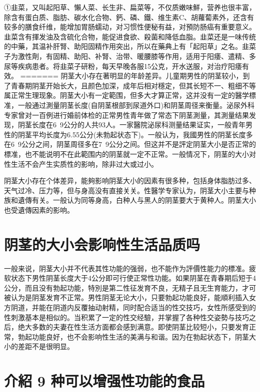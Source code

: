 \documentclass[12pt,UTF8]{ctexbook}
\begin{document}
①韭菜，又叫起阳草、懶人菜、长生非、扁菜等，不仅质嫩味鮮，营养也很丰富，除含有蛋白质、脂肪、碳水化合物、鈣、磷、鐵、维生素C、胡蘿蔔素外，还含有较多的膳食纤维，能增加胃肠蠕动，对习惯性便秘有益，对預防肠癌有重要意义。韭菜含有揮发油及含硫化合物，能促进食欲、殺菌和降低血脂。韭菜还是一味传统的中藥，其温补肝腎、助阳固精作用突出，所以在藥典上有「起阳草」之名。韭菜子为激性劑，有固精、助阳、补腎、治带、暖腰膝等作用，适用于阳痿、遣精、多尿等疾病患者。将韭菜子研粉，每天早晚各服15公克，开水送服，对治疗阳痿有效。
=======
阴茎大小存在著明显的年龄差异。儿童期男性的阴茎较小，到了青春期阴茎开始长大，且颜色加深，成年后相对穩定，但其长短不一、粗细不等属正常生理现象。阴茎大小有一定範围，但多大才算正常，这并没有一定的醫学標准，一般通过測量阴茎长度(自阴茎根部到尿道外口)和阴茎周径来衡量。泌尿外科专家曾对一百例进行婚前体检的正常男性青年做了常态下阴茎測量，其測量结果发现，阴茎长度在6~9公分的人共93人。一家醫院泌尿科测量结果证实，一般青年男性的阴茎平均长度为6.55公分(未勃起状态下)。一般认为，我國男性的阴茎长度多在6~9公分之间，阴茎周径多在7~9公分之间。但这并不是評定阴茎大小是否正常的標准，也不能说明不在此範围内的阴茎就一定不正常。一般情况下，阴茎的大小对性生活不会产生实质性的影响，除非过大或过小。

阴茎大小存在个体差异，能夠影响阴茎大小的因素有很多种，包括身体脂肪过多、天气过冷、压力等，但与身高没有直接关关。性醫学专家认为，阴茎大小主要与种族和遺傳有关。一般认为同等身高，白种人与黑人的阴茎要大于黄种人。阴茎大小也受遺傳因素的影响。

\section{阴茎的大小会影响性生活品质吗}

一般来说，阴茎大小并不代表其性功能的强弱，也不能作为評價性能力的標准。疲软状态下男性阴茎长度大于4公分即可行使正常性功能。如果阴茎在青春期后短于4公分，而且没有勃起功能，特別是第二性征发育不良，无精子且无生育能力，才可被认为是阴茎发育不正常。男性阴茎无论大小，只要勃起功能良好，能順利插入女方阴道，并能在阴道内反覆抽动射精，同时配合适当的性交技巧，女性所感受到的性刺激基本是相似的。当积累了一定的性交经驗，并掌握了各种性交姿勢与技巧之后，绝大多数的夫妻在性生活方面都会感到满意。即使阴茎比较短小，只要发育正常，勃起功能良好，也不会影响性生活的美满与和谐。因为在勃起状态下，阴茎大小的差距不是很明显。

\section{介紹 9 种可以增强性功能的食品}
\end{document}
